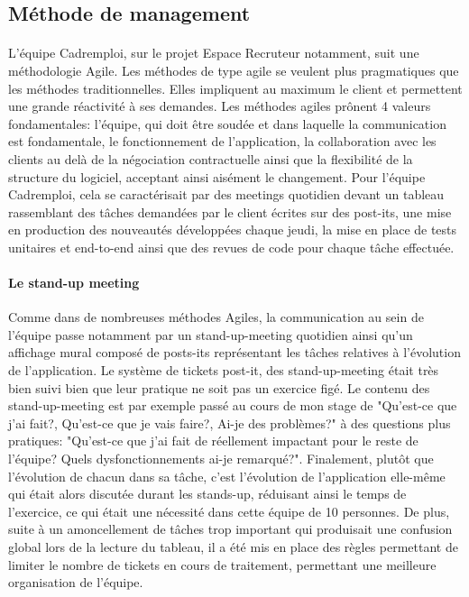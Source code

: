 \subsection{Méthode de management}
\label{sub:Méthode de management}
\paragraph{}
L'équipe Cadremploi, sur le projet Espace Recruteur notamment, suit une méthodologie Agile.
Les méthodes de type agile se veulent plus pragmatiques que les méthodes traditionnelles.
Elles impliquent au maximum le client et permettent une grande réactivité à ses demandes.
Les méthodes agiles prônent 4 valeurs fondamentales: l'équipe, qui doit être soudée et dans laquelle la communication est fondamentale, le fonctionnement de l'application, la collaboration avec les clients au delà de la négociation contractuelle ainsi que la flexibilité de la structure du logiciel, acceptant ainsi aisément le changement.
Pour l'équipe Cadremploi, cela se caractérisait par des meetings quotidien devant un tableau rassemblant des tâches demandées par le client écrites sur des post-its, une mise en production des nouveautés développées chaque jeudi, la mise en place de tests unitaires et end-to-end ainsi que des revues de code pour chaque tâche effectuée.
\paragraph{Le stand-up meeting}
Comme dans de nombreuses méthodes Agiles, la communication au sein de l'équipe passe notamment par un stand-up-meeting quotidien ainsi qu'un affichage mural composé de posts-its représentant les tâches relatives à l'évolution de l'application.
Le système de tickets post-it, des stand-up-meeting était très bien suivi bien que leur pratique ne soit pas un exercice figé.
Le contenu des stand-up-meeting est par exemple passé au cours de mon stage de "Qu'est-ce que j'ai fait?, Qu'est-ce que je vais faire?, Ai-je des problèmes?" à des questions plus pratiques: "Qu'est-ce que j'ai fait de réellement impactant pour le reste de l'équipe? Quels dysfonctionnements ai-je remarqué?".
Finalement, plutôt que l'évolution de chacun dans sa tâche, c'est l'évolution de l'application elle-même qui était alors discutée durant les stands-up, réduisant ainsi le temps de l'exercice, ce qui était une nécessité dans cette équipe de 10 personnes.
De plus, suite à un amoncellement de tâches trop important qui produisait une confusion global lors de la lecture du tableau, il a été mis en place des règles permettant de limiter le nombre de tickets en cours de traitement, permettant une meilleure organisation de l'équipe.
